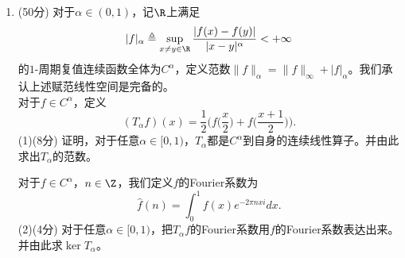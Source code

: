 \begin{enumerate}
    (2)(4分) 假设有$\mathcal{H}$中单位向量$\eta_1,\eta_2$，满足$\operatorname{supp}(T\eta_2)\setminus\operatorname{supp}(T\eta_1)\neq\varnothing$。
    我们取$x_1\in\operatorname{supp}(T\eta_1)$，$x_2\in\operatorname{supp}(T\eta_2)\setminus\operatorname{supp}(T\eta_1)$，
    并记$\alpha_1=1$。证明：存在$\alpha_2\in(0,\frac{1}{2})$使得：
    \[\|T(\alpha_1\eta_1+\alpha_2\eta_2)(x_1)\|
    >\frac{3}{4}\|T(\alpha_1\eta_1)(x_1)\|\]
    且\[T(\alpha_1\eta_1+\alpha_2\eta_2)(x_2)\neq0.\]
    (3)(4分) 进而取$x_3\in\operatorname{supp}(T\eta_3)\setminus(\operatorname{supp}(T\eta_1)\cup\operatorname{supp}(T\eta_2))$
    (其中$\eta_3$是一个单位向量)。证明：存在$\alpha_3\in(0,\frac{1}{4})$使得：
    \[\|T(\alpha_1\eta_1+\alpha_2\eta_2+\alpha_3\eta_3)(x_1)\|
    >\Big(1-\frac{1}{4}-\frac{1}{8}\Big)\|T(\alpha_1\eta_1)(x_1)\|,\]
    \[\|T(\alpha_1\eta_1+\alpha_2\eta_2+\alpha_3\eta_3)(x_2)\|
    >\Big(1-\frac{1}{4}\Big)\|T(\alpha_2\eta_2)(x_2)\|,\]
    且\[T(\alpha_1\eta_1+\alpha_2\eta_2+\alpha_3\eta_3)(x_3)\neq0.\]
    (4)(8分) 进而假设存在一列$\mathcal{H}$中单位向量$\{\eta_n\}$满足对于任何自然数$n$，
    $\operatorname{supp}(T\eta_n)\setminus\Big(\bigcup\limits_{k=1}^{n-1} \operatorname{supp}(T\eta_k)\Big)$非空，
    我们取$x_n\in\operatorname{supp}(T\eta_n)\setminus\Big(\bigcup\limits_{k=1}^{n-1} \operatorname{supp}(T\eta_k)\Big)$。
    请由此推出矛盾，从而证明：存在有限集$F\subseteq\N$使得对于任何的$\xi \in \mathcal{H}$，有$\operatorname{supp}(T\xi)\subseteq F$。\\
    (5)(8分) 证明：$\mathcal{H}$上任一紧算子都可以写成一列满足(2)中条件($\star$)的有界线性算子在算子范数下的极限。

    \item (50分) 对于$\alpha\in(0,1)$，记$\R$上满足
    \[|f|_\alpha\triangleq\sup_{x \ne y\in\R}\frac{|f(x)-f(y)|}{|x-y|^\alpha}<+\infty\]
    的$1$-周期复值连续函数全体为$C^\alpha$，定义范数$\|f\|_\alpha=\|f\|_\infty+|f|_\alpha$。我们承认上述赋范线性空间是完备的。\\
    对于$f\in C^{\alpha}$，定义
    \[(T_\alpha f)(x)=\frac{1}{2}\bigg(f\Big(\frac{x}{2}\Big)+f\Big(\frac{x+1}{2}\Big)\bigg).\]
    (1)(8分) 证明，对于任意$\alpha\in[0,1)$，$T_\alpha$都是$C^\alpha$到自身的连续线性算子。并由此求出$T_\alpha$的范数。

    对于$f\in C^\alpha$，$n\in\Z$，我们定义$f$的Fourier系数为
    \[\widehat{f}(n)=\int_0^1 f(x)e^{-2\pi nxi} dx.\]
    (2)(4分) 对于任意$\alpha\in[0,1)$，把$T_\alpha f$的Fourier系数用$f$的Fourier系数表达出来。并由此求$\ker T_\alpha$。


\end{enumerate}
